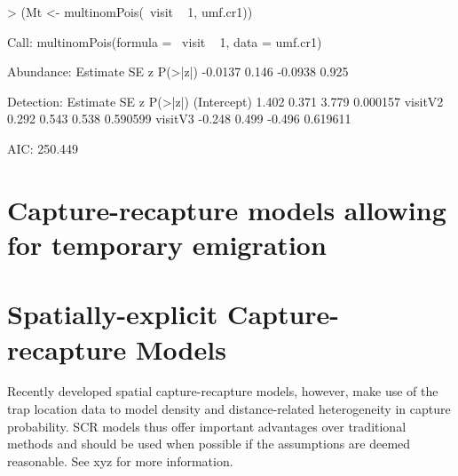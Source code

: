 \documentclass[a4paper]{article}
\renewenvironment{Schunk}{\vspace{\topsep}}{\vspace{\topsep}}
\begin{document}
\begin{Schunk}
\begin{Sinput}
> (Mt <- multinomPois(~visit ~ 1, umf.cr1))
\end{Sinput}
\begin{Soutput}
Call:
multinomPois(formula = ~visit ~ 1, data = umf.cr1)

Abundance:
 Estimate    SE       z P(>|z|)
  -0.0137 0.146 -0.0938   0.925

Detection:
            Estimate    SE      z  P(>|z|)
(Intercept)    1.402 0.371  3.779 0.000157
visitV2        0.292 0.543  0.538 0.590599
visitV3       -0.248 0.499 -0.496 0.619611

AIC: 250.449 
\end{Soutput}
\end{Schunk}



\section{Capture-recapture models allowing for temporary emigration}



\section{Spatially-explicit Capture-recapture Models}

Recently developed spatial capture-recapture models,
however, make use of the trap location data to model density and
distance-related heterogeneity in capture probability. SCR models thus
offer important advantages over traditional methods and should be used
when possible if the assumptions are deemed reasonable. See xyz for
more information.




\end{document}
